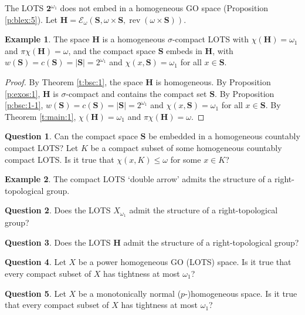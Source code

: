 \documentclass[preprint]{elsarticle}
\def\om{\omega}
\def\cE{\mathcal{E}}
\theoremstyle{definition}
\newtheorem{example}{Example}
\newtheorem{question}{Question}
\theoremstyle{remark}
\def\rev{\operatorname{rev}}
\def\lex#1#2{\mathfrak{L}(#2^{#1})}
\def\lex#1#2{#2^{#1}}
\def\B{2}
\def\B{\mathsf{2}}
\def\B{\mathbf{2}}
\def\sS{\mathbf{S}}
\def\Hs{\mathbf{H}}
\def\ex{\cE}
\begin{document}
The LOTS $\lex {\om_1} \B$ does not embed in a homogeneous GO space (Proposition \ref{p:blex:5}).
Let $\Hs=\ex_\om(\sS, \om\times \sS, \rev(\om\times \sS))$.

\begin{example}\label{e:5}
The space $\Hs$ is a homogeneous $\sigma$-compact LOTS with $\chi(\Hs)=\om_1$ and $\pi\chi(\Hs)=\om$, and the compact space $\sS$ embeds in $\Hs$, with $w(\sS)=c(\sS)=|\sS|=2^{\om_1}$ and $\chi(x,\sS)=\om_1$ for all $x\in\sS$.
\end{example}
\begin{proof}
By Theorem \ref{t:bsc:1}, the space $\Hs$ is homogeneous. By Proposition \ref{p:exos:1}, $\Hs$ is $\sigma$-compact and contains the compact set $\sS$. By Proposition \ref{p:bsc:1-1}, $w(\sS)=c(\sS)=|\sS|=2^{\om_1}$ and $\chi(x,\sS)=\om_1$ for all $x\in\sS$.
By Theorem \ref{t:main:1}, $\chi(\Hs)=\om_1$ and $\pi\chi(\Hs)=\om$.
\end{proof}

\begin{question}\label{q:1-1}
Can the compact space $\sS$ be embedded in a homogeneous countably compact LOTS? Let $K$ be a compact subset of some homogeneous countably compact LOTS. Is it true that $\chi(x,K)\leq\om$ for some $x\in K$?
\end{question}


\begin{example}\label{e:6} \cite{Banakh2008}
The compact LOTS `double arrow' admits the structure of a right-topological group.
\end{example}

\begin{question}\label{q:1}
Does the LOTS $X_{\om_1}$ admit the structure of a right-topological group?
\end{question}

\begin{question}\label{q:1+1}
Does the LOTS $\Hs$ admit the structure of a right-topological group?
\end{question}


\begin{question}\label{q:2}
Let $X$ be a power homogeneous GO (LOTS) space.
Is it true that every compact subset of $X$ has tightness at most $\om_1$?
\end{question}

\begin{question}\label{q:3}
Let $X$ be a monotonically normal ($p$-)homogeneous space.
Is it true that every compact subset of $X$ has tightness at most $\om_1$?
\end{question}
\end{document}
